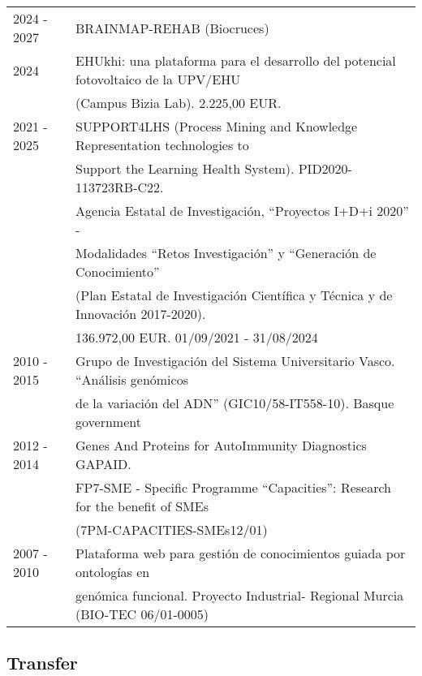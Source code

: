 \documentclass[11pt,fullpage]{article}
\begin{document}
\begin{tabular}{ll}
  2024 - 2027 & BRAINMAP-REHAB (Biocruces) \\
  2024        & EHUkhi: una plataforma para el desarrollo del potencial fotovoltaico de la UPV/EHU \\
              &  (Campus Bizia Lab). 2.225,00 EUR.\\
  2021 - 2025 & SUPPORT4LHS (Process Mining and Knowledge Representation technologies to \\ 
              & Support the Learning Health System). PID2020-113723RB-C22. \\ 
              & Agencia Estatal de Investigación, ``Proyectos I+D+i 2020'' - \\ 
              & Modalidades ``Retos Investigación'' y ``Generación de Conocimiento'' \\ 
              & (Plan Estatal de Investigación Científica y Técnica y de Innovación 2017-2020). \\
              & 136.972,00 EUR. 01/09/2021 - 31/08/2024 \\
  2010 - 2015 & Grupo de Investigación del Sistema Universitario Vasco. ``Análisis genómicos \\  
              & de la variación del ADN'' (GIC10/58-IT558-10). Basque government \\
  2012 - 2014 & Genes And Proteins for AutoImmunity Diagnostics GAPAID. \\ 
              & FP7-SME - Specific Programme ``Capacities'': Research for the benefit of SMEs \\ 
              & (7PM-CAPACITIES-SMEs12/01) \\
  2007 - 2010 & Plataforma web para gesti\'on de conocimientos guiada por ontolog\'ias en \\ 
              & gen\'omica funcional. Proyecto Industrial- Regional Murcia (BIO-TEC 06/01-0005) 
\end{tabular}

\subsection*{Transfer}
\end{document}
